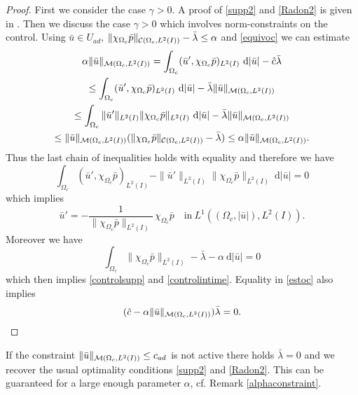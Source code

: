 \begin{proof}
{\color{blue}First we consider the case $\gamma>0$. A proof of \eqref{supp2} and \eqref{Radon2} is given in \cite{pieper2014}.} Then we discuss the case $\gamma>0$ which involves norm-constraints on the control.
Using $\bar u\in U_{ad}$, $\|\chi_{\Omega_c}\bar p\|_{\mathcal{C}(\Omega_c, L^{2}(I))}-\bar\lambda\leq\alpha$ and \eqref{equivoc} we can estimate
\begin{multline}\label{estoc}
\alpha\|\bar u\|_{\M}=\int_{\Omega_c}(\bar u',\chi_{\Omega_c}\bar p)_{L^2(I)}~\mathrm d|\bar u|-\hat c\bar\lambda\\
\leq \int_{\Omega_c}(\bar u',\chi_{\Omega_c}\bar p)_{L^2(I)}~\mathrm d|\bar u|-\bar\lambda\|\bar u\|_{\M}\\
\leq \int_{\Omega_c}\|\bar u'\|_{L^2(I)}\|\chi_{\Omega_c}\bar p\|_{L^2(I)}~\mathrm d|\bar u|-\bar\lambda\|\bar u\|_{\M}\\
\leq\|\bar u\|_{\M}(\|\chi_{\Omega_c}\bar p\|_{\C}-\bar\lambda)\leq \alpha\|\bar u\|_{\M}.
\end{multline}
Thus the last chain of inequalities holds with equality and therefore we have
\[
\int_{\Omega_c}(\bar u',\chi_{\Omega_c}\bar p)_{L^2(I)}-\|\bar u'\|_{L^2(I)}\|\chi_{\Omega_c}\bar p\|_{L^2(I)}~\mathrm d|\bar u|=0
\]
which implies \[\bar u'=-\frac 1{\|\chi_{\Omega_c}\bar p\|_{L^2(I)}}\,\chi_{\Omega_c}\bar p\quad\text{in}~ L^1((\Omega_c,|\bar u|),L^2(I)).\]
Moreover we have
\[
\int_{\Omega_c}\|\chi_{\Omega_c}\bar p\|_{L^2(I)}-\bar\lambda-\alpha~\mathrm d|\bar u|=0
\]
which then implies \eqref{controlsupp} and \eqref{controlintime}. Equality in \eqref{estoc} also implies
\[
(\hat c-\alpha\|\bar u\|_{\mathcal{M}(\Omega_c, L^{2}(I))})\bar\lambda=0.
\]
\qquad\end{proof}

\begin{remark}
{\color{red} If the constraint $\|\bar u\|_{\mathcal{M}(\Omega_c, L^{2}(I))}\leq c_{ad}$ is not active there holds $\bar \lambda=0$ and we recover the usual optimality conditions \eqref{supp2} and \eqref{Radon2}. This can be guaranteed for a large enough parameter $\alpha$, cf. Remark \ref{alphaconstraint}.}
\end{remark}


